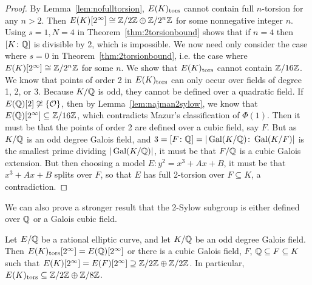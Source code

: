 \begin{proof}
By Lemma~\ref{lem:nofulltorsion}, $E(K)_{\text{tors}}$ cannot contain full $n$-torsion for any $n > 2$. Then $E(K)[2^\infty] \cong \mathbb{Z}/2\mathbb{Z} \oplus \mathbb{Z}/2^n\mathbb{Z}$ for some nonnegative integer $n$. Using $s=1, N=4$ in Theorem~\ref{thm:2torsionbound} shows that if $n= 4$ then $[K \colon \mathbb{Q}]$ is divisible by 2, which is impossible. We now need only consider the case where $s= 0$ in Theorem~\ref{thm:2torsionbound}, i.e. the case where $E(K)[2^\infty] \cong \mathbb{Z}/2^n\mathbb{Z}$ for some $n$. We show that $E(K)_{\text{tors}}$ cannot contain $\mathbb{Z}/16\mathbb{Z}$. We know that points of order 2 in $E(K)_{\text{tors}}$ can only occur over fields of degree 1, 2, or 3. Because $K/\mathbb{Q}$ is odd, they cannot be defined over a quadratic field. If $E(\mathbb{Q})[2] \not\cong \{ \mathcal{O} \}$, then by Lemma~\ref{lem:najman2sylow}, we know that $E(\mathbb{Q})[2^\infty] \subseteq \mathbb{Z}/16\mathbb{Z}$, which contradicts Mazur's classification of $\Phi(1)$. Then it must be that the points of order 2 are defined over a cubic field, say $F$. But as $K/\mathbb{Q}$ is an odd degree Galois field, and $3= [F \colon \mathbb{Q}]= |\operatorname{Gal}(K/\mathbb{Q}) \colon \operatorname{Gal}(K/F)|$ is the smallest prime dividing $|\operatorname{Gal}(K/\mathbb{Q})|$, it must be that $F/\mathbb{Q}$ is a cubic Galois extension. But then choosing a model $E: y^2= x^3 + Ax + B$, it must be that $x^3 + Ax + B$ splits over $F$, so that $E$ has full 2-torsion over $F \subseteq K$, a contradiction. 
\end{proof}


We can also prove a stronger result that the 2-Sylow subgroup is either defined over $\mathbb{Q}$ or a Galois cubic field.


\begin{lem} \label{lem:2sylowoddqgal}
Let $E/\mathbb{Q}$ be a rational elliptic curve, and let $K/\mathbb{Q}$ be an odd degree Galois field. Then $E(K)_{\text{tors}}[2^\infty]= E(\mathbb{Q})[2^\infty]$ or there is a cubic Galois field, $F$, $\mathbb{Q} \subseteq F \subseteq K$ such that $E(K)[2^\infty]= E(F)[2^\infty] \supseteq \mathbb{Z}/2\mathbb{Z} \oplus \mathbb{Z}/2\mathbb{Z}$. In particular, $E(K)_{\text{tors}} \subseteq \mathbb{Z}/2\mathbb{Z} \oplus \mathbb{Z}/8\mathbb{Z}$.  
\end{lem}

